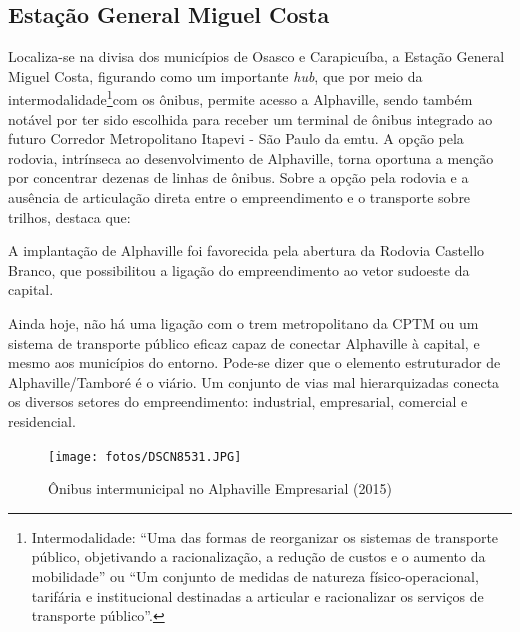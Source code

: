 	\subsection{Estação General Miguel Costa}
	Localiza-se na divisa dos municípios de Osasco e Carapicuíba, a Estação General Miguel Costa, figurando como um importante \textit{hub}, que por meio da intermodalidade\footnote{Intermodalidade: ``Uma das formas de reorganizar os sistemas de transporte público, objetivando a racionalização, a redução de custos e o aumento da mobilidade'' ou ``Um conjunto de medidas de natureza físico-operacional, tarifária e institucional destinadas a articular e racionalizar os serviços de		transporte público''.}com os ônibus, permite acesso a Alphaville, sendo também notável por ter sido escolhida para receber um terminal de ônibus integrado ao futuro Corredor Metropolitano Itapevi - São Paulo da \gls{emtu}. A opção pela rodovia, intrínseca ao desenvolvimento de Alphaville, torna oportuna a menção por concentrar dezenas de linhas de ônibus. Sobre a opção pela rodovia e a ausência de articulação direta entre o empreendimento e o transporte sobre trilhos,  destaca que:
	\begin{citacao}
		A implantação de Alphaville foi favorecida pela abertura da Rodovia Castello Branco, que possibilitou a ligação do empreendimento ao vetor sudoeste da capital.
		
		Ainda hoje, não há uma ligação com o trem metropolitano da CPTM ou um sistema de transporte público eficaz capaz de conectar Alphaville à capital, e mesmo aos municípios do entorno. Pode-se dizer que o elemento estruturador de Alphaville/Tamboré é o viário. Um conjunto de vias mal hierarquizadas conecta os diversos setores do empreendimento: industrial, empresarial, comercial e residencial.
		\cite[pág. 125]{Falcone}
	\end{citacao}
	
	\begin{figure}[tp]
		\caption{Ônibus intermunicipal no Alphaville Empresarial (2015)}
		\texttt{[image: fotos/DSCN8531.JPG]}
	\end{figure}
	
